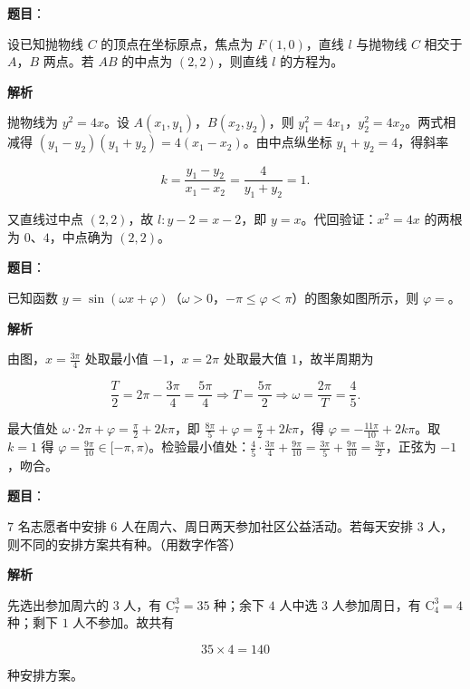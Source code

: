 \begin{answer}

\textbf{题目}：

设已知抛物线 $C$ 的顶点在坐标原点，焦点为 $F(1,0)$，直线 $l$ 与抛物线 $C$ 相交于 $A$，$B$ 两点。若 $AB$ 的中点为 $(2,2)$，则直线 $l$ 的方程为\gkblank{}。

\textbf{解析}

抛物线为 $y^2=4x$。设 $A(x_1,y_1)$，$B(x_2,y_2)$，则 $y_1^2=4x_1$，$y_2^2=4x_2$。两式相减得 $(y_1-y_2)(y_1+y_2)=4(x_1-x_2)$。由中点纵坐标 $y_1+y_2=4$，得斜率

\nopagebreak[4]
\[k=\frac{y_1-y_2}{x_1-x_2}=\frac{4}{y_1+y_2}=1 .\]

又直线过中点 $(2,2)$，故 $l:y-2=x-2$，即 $y=x$。代回验证：$x^2=4x$ 的两根为 $0$、$4$，中点确为 $(2,2)$。


\end{answer}
\begin{answer}

\textbf{题目}：

已知函数 $y=\sin(\omega x+\varphi)$（$\omega>0$，$-\pi\leqslant\varphi<\pi$）的图象如图所示，则 $\varphi=$\gkblank{}。
\nopagebreak[4]
\begin{center}\end{center}
\nopagebreak[4]
\textbf{解析}

由图，$x=\frac{3\pi}{4}$ 处取最小值 $-1$，$x=2\pi$ 处取最大值 $1$，故半周期为

\nopagebreak[4]
\[\frac T2=2\pi-\frac{3\pi}{4}=\frac{5\pi}{4}\Longrightarrow T=\frac{5\pi}{2}\Longrightarrow \omega=\frac{2\pi}{T}=\frac45 .\]

最大值处 $\omega\cdot2\pi+\varphi=\frac{\pi}{2}+2k\pi$，即 $\frac{8\pi}{5}+\varphi=\frac{\pi}{2}+2k\pi$，得 $\varphi=-\frac{11\pi}{10}+2k\pi$。取 $k=1$ 得 $\varphi=\frac{9\pi}{10}\in[-\pi,\pi)$。检验最小值处：$\frac45\cdot\frac{3\pi}{4}+\frac{9\pi}{10}=\frac{3\pi}{5}+\frac{9\pi}{10}=\frac{3\pi}{2}$，正弦为 $-1$，吻合。


\end{answer}
\begin{answer}

\textbf{题目}：

$7$ 名志愿者中安排 $6$ 人在周六、周日两天参加社区公益活动。若每天安排 $3$ 人，则不同的安排方案共有\gkblank{}种。（用数字作答）

\textbf{解析}

先选出参加周六的 $3$ 人，有 $\mathrm C_7^3=35$ 种；余下 $4$ 人中选 $3$ 人参加周日，有 $\mathrm C_4^3=4$ 种；剩下 $1$ 人不参加。故共有

\nopagebreak[4]
\[35\times4=140\]

种安排方案。


\end{answer}
